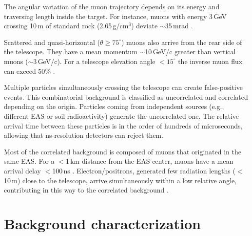\documentclass{PoS}
\begin{document}
The angular variation of the muon trajectory depends on its energy and traversing length inside the target. For instance, muons with energy 3\,GeV crossing 10\,m of standard rock (2.65\,g/cm$^3$) deviate $\sim$35\,mrad \cite{PenaRodrguezPhD2020}.

Scattered and quasi-horizontal ($\theta \geq 75^{\circ}$) muons also arrive from the rear side of the telescope. They have a mean momentum $\sim$10\,GeV/c greater than vertical muons ($\sim$3\,GeV/c). For a telescope elevation angle $<15^{\circ}$ the inverse muon flux can exceed 50$\%$ \cite{Jourde2013}.

Multiple particles simultaneously crossing the telescope can create false-positive events. This combinatorial background is classified as uncorrelated and correlated depending on the origin. Particles coming from independent sources (e.g., different EAS or soil radioactivity) generate the uncorrelated one. The relative arrival time between these particles is in the order of hundreds of microseconds, allowing that ns-resolution detectors can reject them.

Most of the correlated background is composed of muons that originated in the same EAS. For a $<$1\,km distance from the EAS center, muons have a mean arrival delay $<$100\,ns \cite{GarciaGamez2010}. Electron/positrons, generated few radiation lengths ($<$10\,m) close to the telescope, arrive simultaneously within a low relative angle, contributing in this way to the correlated background \cite{Olah2017}.

\section{Background characterization}
\end{document}
